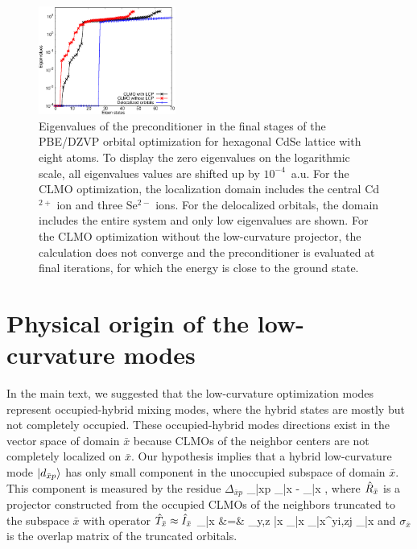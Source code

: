 \documentclass[aps,prl,twocolumn,reprint,amsmath,amssymb]{revtex4-1}
\begin{document}
\begin{figure}[t!]
\centering
\includegraphics[width=0.4\textwidth]{Hesseig}
\caption{Eigenvalues of the preconditioner in the final stages of the PBE/DZVP orbital optimization for hexagonal CdSe lattice with eight atoms. To display the zero eigenvalues on the logarithmic scale, all eigenvalues values are shifted up by $10^{-4}$~a.u. For the CLMO optimization, the localization domain includes the central Cd$^{2+}$ ion and three Se$^{2-}$ ions. For the delocalized orbitals, the domain includes the entire system and only low eigenvalues are shown. For the CLMO optimization without the low-curvature projector, the calculation does not converge and the preconditioner is evaluated at final iterations, for which the energy is close to the ground state.}
\label{sfig:hesseig}
\end{figure}

\section{Physical origin of the low-curvature modes}

In the main text, we suggested that the low-curvature optimization modes represent occupied-hybrid mixing modes, where the hybrid states are mostly but not completely occupied. 
These occupied-hybrid modes directions exist in the vector space of domain $\bar{x}$ because CLMOs of the neighbor centers are not completely localized on $\bar{x}$. 
Our hypothesis implies that a hybrid low-curvature mode $\vert d_{\bar{x}p} \rangle$ has only small component in the unoccupied subspace of domain $\bar{x}$. 
This component is measured by the residue $\Delta_{\bar{x}p}$ 
%
\bea
\Delta_{\bar{x}p} \equiv {} _{\bar{x}} - _{\bar{x}} , 
\eea
%
where $\hat{R}_{\bar{x}}$ is a projector constructed from the occupied CLMOs of the neighbors truncated to the subspace $\bar{x}$ with operator $\hat{T}_{\bar{x}} \approx \hat{I}_{\bar{x}}$
%
\bea
{}_{\bar{x}} &=& \sum_{y,z \in \bar{x}} _{\bar{x}}  \sigma_{\bar{x}}^{yi,zj}  _{\bar{x}}
\eea
%
and $\sigma_{\bar{x}}$ is the overlap matrix of the truncated orbitals. 
\end{document}
